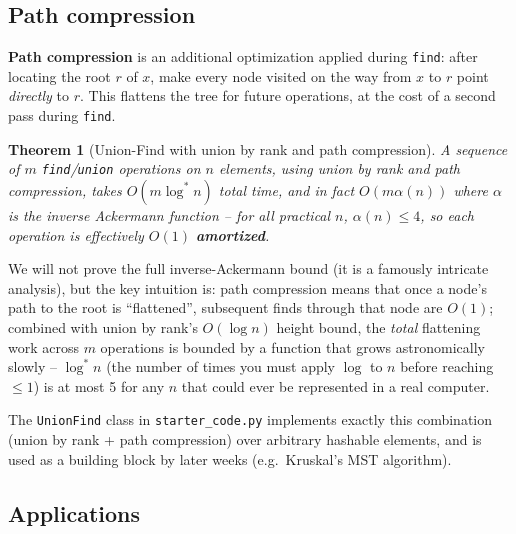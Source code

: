\documentclass[11pt]{article}
\newtheorem{theorem}{Theorem}[section]
\begin{document}
\subsection{Path compression}

\textbf{Path compression} is an additional optimization applied during \texttt{find}:
after locating the root $r$ of $x$, make every node visited on the way from $x$ to $r$
point \emph{directly} to $r$. This flattens the tree for future operations, at the cost
of a second pass during \texttt{find}.

\begin{theorem}[Union-Find with union by rank and path compression]
\label{thm:uf-amortized}
A sequence of $m$ \texttt{find}/\texttt{union} operations on $n$ elements, using union by
rank \emph{and} path compression, takes $O(m \log^* n)$ total time, and in fact
$O(m \alpha(n))$ where $\alpha$ is the inverse Ackermann function -- for all practical
$n$, $\alpha(n) \le 4$, so each operation is effectively $O(1)$ \textbf{amortized}.
\end{theorem}

We will not prove the full inverse-Ackermann bound (it is a famously intricate analysis),
but the key intuition is: path compression means that once a node's path to the root is
``flattened'', subsequent finds through that node are $O(1)$; combined with union by
rank's $O(\log n)$ height bound, the \emph{total} flattening work across $m$ operations
is bounded by a function that grows astronomically slowly -- $\log^* n$ (the number of
times you must apply $\log$ to $n$ before reaching $\le 1$) is at most 5 for any $n$ that
could ever be represented in a real computer.

The \texttt{UnionFind} class in \texttt{starter\_code.py} implements exactly this
combination (union by rank + path compression) over arbitrary hashable elements, and is
used as a building block by later weeks (e.g.\ Kruskal's MST algorithm).

\subsection{Applications}
\end{document}
